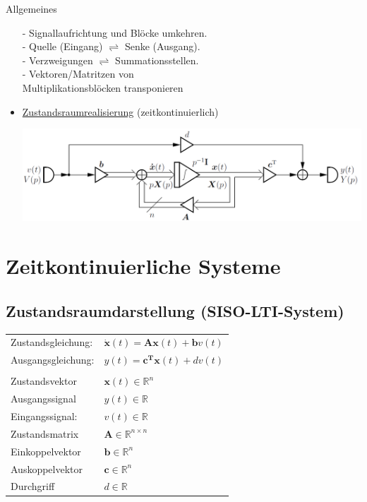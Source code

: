 \documentclass[a4paper,landscape,6pt]{article}
\newcommand{\ma}[1]{\ensuremath{\boldsymbol {#1}}}								%
\renewcommand{\vec}[1]{\ensuremath{\boldsymbol {#1}}}							%
\newcommand{\ul}[1]{\underline{#1}}
\begin{document}
\begin{multicols}{3}
\begin{infobox}{Allgemeines}
\begin{itemize}
		- Signallaufrichtung und Blöcke umkehren.\\
		- Quelle (Eingang) $\rightleftharpoons$ Senke (Ausgang).\\
		- Verzweigungen $\rightleftharpoons$ Summationsstellen.\\
	- Vektoren/Matritzen von \\ Multiplikationsblöcken transponieren
		\item \ul{Zustandsraumrealisierung} (zeitkontinuierlich)
		\begin{minipage}[t]{0.8\textwidth}
			\includegraphics[width=1\textwidth]{images_ssp/Zustandsraumreal}\\
		\end{minipage}
	\end{itemize}
\end{infobox}



\section{Zeitkontinuierliche Systeme}
\subsection*{Zustandsraumdarstellung \footnotesize{(SISO-LTI-System)}}

	\begin{tabular}{ll}
	Zustandsgleichung: & $ \dot{\vec x}(t) = \ma A \vec x(t) + \vec b v(t) $\\
	Ausgangsgleichung: & $ y(t) = \vec c^{\ma T} \vec x(t) + d v(t)$ \\\\
	Zustandsvektor & $\vec x(t) \in \mathbb R^n$ \\
	Ausgangssignal & $ y(t) \in \mathbb R$ \\
	Eingangssignal: & $ v(t) \in \mathbb R$ \\
	Zustandsmatrix & $\ma A\in \mathbb R^{n \times n}$ \\
	Einkoppelvektor & $\vec b \in \mathbb R^{n}$ \\
	Auskoppelvektor & $\vec c \in \mathbb R^{n}$ \\
	Durchgriff & $d \in \mathbb R$ \\


\end{tabular}
\end{multicols}
\end{document}
